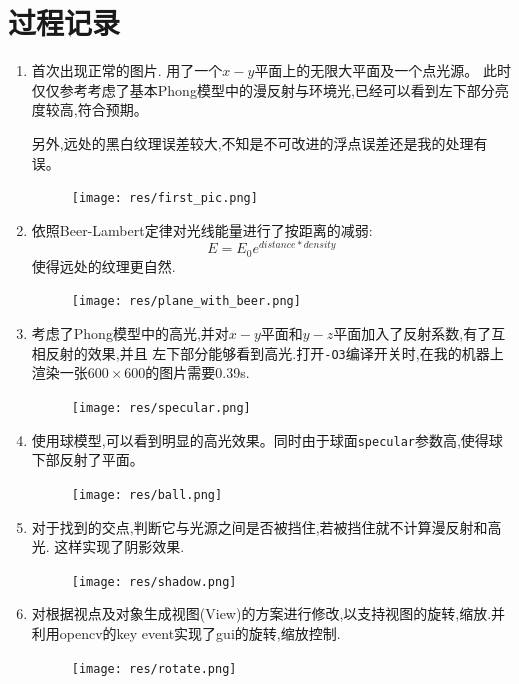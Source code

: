 \section{过程记录}
\begin{enumerate}
    \item
首次出现正常的图片. 用了一个$ x-y$平面上的无限大平面及一个点光源。
此时仅仅参考\cite{phong}考虑了基本Phong模型中的漫反射与环境光,已经可以看到左下部分亮度较高,符合预期。

另外,远处的黑白纹理误差较大,不知是不可改进的浮点误差还是我的处理有误。
\begin{figure}[H]
  \centering
  \texttt{[image: res/first\_pic.png]}
  \caption{\label{fig:first}}
\end{figure}

\item
依照Beer-Lambert定律\cite{beer}对光线能量进行了按距离的减弱:
\[ E = E_0 e^{distance * density}\]
使得远处的纹理更自然.
\begin{figure}[H]
  \centering
  \texttt{[image: res/plane\_with\_beer.png]}
  \caption{\label{fig:beer}}
\end{figure}

\item

考虑了Phong模型中的高光,并对$ x-y$平面和$ y-z$平面加入了反射系数,有了互相反射的效果,并且
左下部分能够看到高光.打开\verb|-O3|编译开关时,在我的机器上渲染一张$600 \times 600$的图片需要0.39s.
\begin{figure}[H]
  \centering
  \texttt{[image: res/specular.png]}
  \caption{\label{fig:specular}}
\end{figure}

\item

  使用球模型,可以看到明显的高光效果。同时由于球面\verb|specular|参数高,使得球下部反射了平面。
\begin{figure}[H]
  \centering
  \texttt{[image: res/ball.png]}
  \caption{\label{fig:ball}}
\end{figure}

\item
  对于找到的交点,判断它与光源之间是否被挡住,若被挡住就不计算漫反射和高光. 这样实现了阴影效果.
\begin{figure}[H]
  \centering
  \texttt{[image: res/shadow.png]}
  \caption{\label{fig:shadow}}
\end{figure}

\item 对根据视点及对象生成视图(View)的方案进行修改,以支持视图的旋转,缩放.并利用opencv的key event实现了gui的旋转,缩放控制.
\begin{figure}[H]
  \centering
  \texttt{[image: res/rotate.png]}
  \caption{\label{fig:rotate}}
\end{figure}


\end{enumerate}
